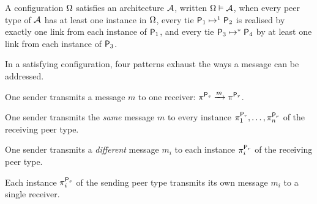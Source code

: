 \begin{definition}
    \label{def:arch-satisfaction}
    A configuration $\peerconf$ satisfies an architecture $\arch$, written $\peerconf \vDash \arch$, when
    every peer type of $\arch$ has at least one instance in $\peerconf$,
    every tie $\tieSingle{\pfam[1]}{\pfam[2]}$ is realised by exactly one link from each instance of $\pfam[1]$,
    and every tie $\tieMult{\pfam[3]}{\pfam[4]}$ by at least one link from each instance of $\pfam[3]$.
\end{definition}

In a satisfying configuration, four patterns exhaust the ways a message can be addressed.

\begin{definition}
    \label{def:point-to-point}
    One sender transmits a message $m$ to one receiver: $\peerinst{\pfam[s]} \xrightarrow{m} \peerinst{\pfam[r]}$.
\end{definition}

\begin{definition}
    \label{def:isotropic}
    One sender transmits the \emph{same} message $m$ to every instance $\peerinst[1]{\pfam[r]},\dots,\peerinst[n]{\pfam[r]}$ of the receiving peer type.
\end{definition}

\begin{definition}
    \label{def:anisotropic}
    One sender transmits a \emph{different} message $m_i$ to each instance $\peerinst[i]{\pfam[r]}$ of the receiving peer type.
\end{definition}

\begin{definition}
    \label{def:co-anisotropic}
    Each instance $\peerinst[i]{\pfam[s]}$ of the sending peer type transmits its own message $m_i$ to a single receiver.
\end{definition}

